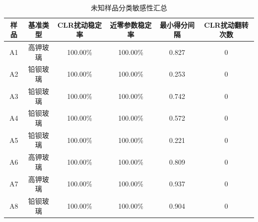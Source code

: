 \begin{table}[H]
  \centering
  \caption{未知样品分类敏感性汇总}
  \label{tab:p3-sensitivity}
  \small
  \begin{tabular}{cccccc}
    \toprule
    样品 & 基准类型 & CLR扰动稳定率 & 近零参数稳定率 & 最小得分间隔 & CLR扰动翻转次数 \\
    \midrule
    A1 & 高钾玻璃 & 100.00\% & 100.00\% & 0.827 & 0 \\
    A2 & 铅钡玻璃 & 100.00\% & 100.00\% & 0.253 & 0 \\
    A3 & 铅钡玻璃 & 100.00\% & 100.00\% & 0.742 & 0 \\
    A4 & 铅钡玻璃 & 100.00\% & 100.00\% & 0.572 & 0 \\
    A5 & 铅钡玻璃 & 100.00\% & 100.00\% & 0.221 & 0 \\
    A6 & 高钾玻璃 & 100.00\% & 100.00\% & 0.809 & 0 \\
    A7 & 高钾玻璃 & 100.00\% & 100.00\% & 0.937 & 0 \\
    A8 & 铅钡玻璃 & 100.00\% & 100.00\% & 0.904 & 0 \\
    \bottomrule
  \end{tabular}
\end{table}

